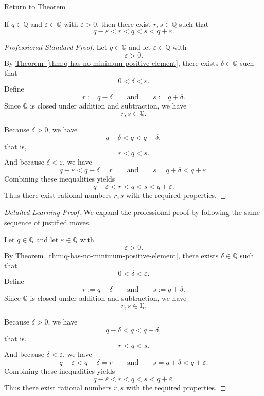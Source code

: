 \newpage
{}
\label{prf:rational-upper-lower-perturbation}

\begin{remark*}[Return]
\hyperref[lem:rational-upper-lower-perturbation]{Return to Theorem}
\end{remark*}

\begin{lemma*}
If $q\in\mathbb{Q}$ and $\varepsilon\in\mathbb{Q}$ with $\varepsilon>0$, then there exist $r,s\in\mathbb{Q}$
such that
\[
q-\varepsilon < r < q < s < q+\varepsilon.
\]
\end{lemma*}

\begin{proof}[Professional Standard Proof]
\LRAProofBodyStart
Let $q\in\mathbb{Q}$ and let $\varepsilon\in\mathbb{Q}$ with
\[
\varepsilon>0.
\]
By
\hyperref[thm:q-has-no-minimum-positive-element]{Theorem~\ref*{thm:q-has-no-minimum-positive-element}},
there exists $\delta\in\mathbb{Q}$ such that
\[
0<\delta<\varepsilon.
\]
Define
\[
r:=q-\delta
\qquad\text{and}\qquad
s:=q+\delta.
\]
Since $\mathbb{Q}$ is closed under addition and subtraction, we have
\[
r,s\in\mathbb{Q}.
\]

Because $\delta>0$, we have
\[
q-\delta<q<q+\delta,
\]
that is,
\[
r<q<s.
\]
And because $\delta<\varepsilon$, we have
\[
q-\varepsilon<q-\delta=r
\qquad\text{and}\qquad
s=q+\delta<q+\varepsilon.
\]
Combining these inequalities yields
\[
q-\varepsilon<r<q<s<q+\varepsilon.
\]
Thus there exist rational numbers $r,s$ with the required properties.
\end{proof}

\begin{proof}[Detailed Learning Proof]
\LRAProofBodyStart
We expand the professional proof by following the same sequence of justified moves.

Let $q\in\mathbb{Q}$ and let $\varepsilon\in\mathbb{Q}$ with
\[
\varepsilon>0.
\]
By
\hyperref[thm:q-has-no-minimum-positive-element]{Theorem~\ref*{thm:q-has-no-minimum-positive-element}},
there exists $\delta\in\mathbb{Q}$ such that
\[
0<\delta<\varepsilon.
\]
Define
\[
r:=q-\delta
\qquad\text{and}\qquad
s:=q+\delta.
\]
Since $\mathbb{Q}$ is closed under addition and subtraction, we have
\[
r,s\in\mathbb{Q}.
\]

Because $\delta>0$, we have
\[
q-\delta<q<q+\delta,
\]
that is,
\[
r<q<s.
\]
And because $\delta<\varepsilon$, we have
\[
q-\varepsilon<q-\delta=r
\qquad\text{and}\qquad
s=q+\delta<q+\varepsilon.
\]
Combining these inequalities yields
\[
q-\varepsilon<r<q<s<q+\varepsilon.
\]
Thus there exist rational numbers $r,s$ with the required properties.
\end{proof}

